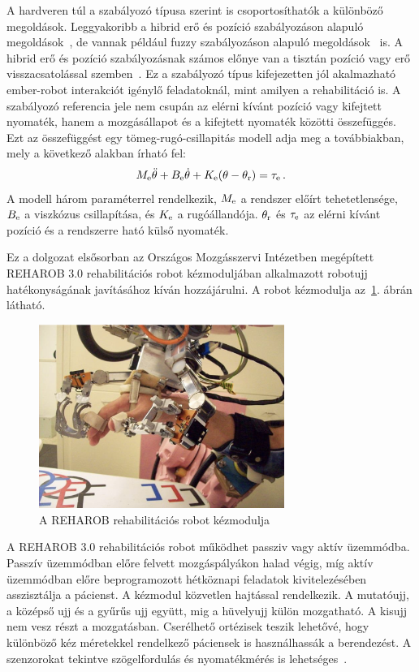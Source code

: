 A hardveren túl a szabályozó típusa szerint is csoportosíthatók a különböző megoldások. Leggyakoribb a hibrid erő és 
pozíció szabályozáson alapuló megoldások~\cite{Hua2019,Xie2021}, de vannak például fuzzy szabályozáson alapuló megoldások~\cite{Hu2023} is.
A hibrid erő és pozíció szabályozásnak számos előnye van a tisztán pozíció vagy erő visszacsatolással 
szemben~\cite{hogan1984Impedance,hogan1985ImpedancePART1,hogan1985ImpedancePART2,hogan1985ImpedancePART3,kovacs2003dynamics,stepan2001vibrations}.
Ez a szabályozó típus kifejezetten jól akalmazható ember-robot interakciót igénylő feladatoknál, mint amilyen 
a rehabilitáció is. A szabályozó referencia jele nem csupán 
az elérni kívánt pozíció vagy kifejtett nyomaték, hanem a mozgásállapot és a kifejtett
nyomaték közötti összefüggés. Ezt az összefüggést egy 
tömeg-rugó-csillapitás modell adja meg a továbbiakban, mely a következő alakban
írható fel: 
\begin{align}
    M_{\mathrm{e}} \ddot \theta + B_{\mathrm{e}} \dot \theta + K_{\mathrm{e}} (\theta - \theta_{\mathrm{r}}) = \tau_{\mathrm{e}}\,.
\end{align}
A modell három paraméterrel rendelkezik, $M_{\mathrm{e}}$ a rendszer előírt tehetetlensége, 
$B_{\mathrm{e}}$ a viszkózus csillapítása, és $K_{\mathrm{e}}$ a rugóállandója. 
$\theta_{\mathrm{r}}$ és $\tau_{\mathrm{e}}$ az elérni kívánt pozíció és a rendszerre ható külső nyomaték. 

Ez a dolgozat elsősorban az Országos Mozgásszervi Intézetben megépített REHAROB 3.0 
rehabilitációs robot kézmoduljában alkalmazott robotujj hatékonyságának javításához kíván hozzájárulni.
A robot kézmodulja az~\ref{fig:reharob_hand_module}. ábrán látható.
\begin{figure}[H]
    \begin{center}
    \includegraphics[width=8cm]{images/reharob_hand_module.png}
    \caption{A REHAROB rehabilitációs robot kézmodulja}\label{fig:reharob_hand_module}
    \end{center}
\end{figure}
A REHAROB 3.0 rehabilitációs robot működhet passziv vagy aktív üzemmódba. Passzív üzemmódban előre felvett 
mozgáspályákon halad végig, míg aktív üzemmódban előre beprogramozott hétköznapi feladatok 
kivitelezésében asszisztálja a pácienst. A kézmodul közvetlen hajtással rendelkezik. A mutatóujj, a középső ujj és a
gyűrűs ujj együtt, mig a hüvelyujj külön mozgatható. A kisujj nem vesz részt a mozgatásban. Cserélhető ortézisek 
teszik lehetővé, hogy különböző kéz méretekkel rendelkező páciensek is használhassák a berendezést. A szenzorokat 
tekintve szögelfordulás és nyomatékmérés is lehetséges~\cite{Bauer2021}.

